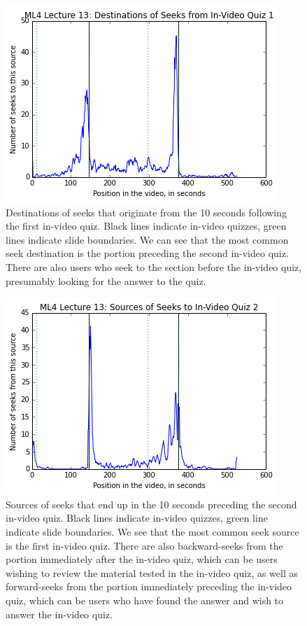 \documentclass[letterpaper]{article}
\begin{document}
\begin{figure}
\includegraphics[width=1.0\columnwidth]{seekdest1}
\caption{Destinations of seeks that originate from the 10 seconds following the first in-video quiz. Black lines indicate in-video quizzes, green lines indicate slide boundaries. We can see that the most common seek destination is the portion preceding the second in-video quiz. There are also users who seek to the section before the in-video quiz, presumably looking for the answer to the quiz.}
\label{fig:seekdest1}
\end{figure}

\begin{figure}
\includegraphics[width=1.0\columnwidth]{seeksrc2}
\caption{Sources of seeks that end up in the 10 seconds preceding the second in-video quiz. Black lines indicate in-video quizzes, green line indicate slide boundaries. We see that the most common seek source is the first in-video quiz. There are also backward-seeks from the portion immediately after the in-video quiz, which can be users wishing to review the material tested in the in-video quiz, as well as forward-seeks from the portion immediately preceding the in-video quiz, which can be users who have found the answer and wish to answer the in-video quiz.}
\label{fig:seeksrc2}
\end{figure}
\end{document}

